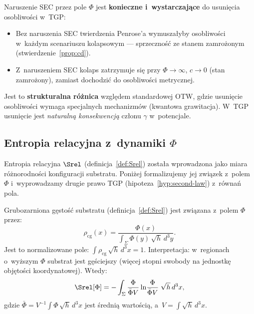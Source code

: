 \begin{remark}\label{rem:energ-sing}
Naruszenie SEC przez pole $\Phi$ jest \textbf{konieczne
i~wystarczaj\k{a}ce} do usuni\k{e}cia osobliwo\'sci w~TGP:
\begin{itemize}[nosep]
  \item Bez naruszenia SEC twierdzenia Penrose'a wymusza\l{}yby
    osobliwo\'sci w~ka\.zdym scenariuszu kolapsowym ---
    sprzeczno\'s\'c ze stanem zamro\.zonym
    (stwierdzenie~\ref{prop:cd}).
  \item Z~naruszeniem SEC kolaps zatrzymuje si\k{e} przy
    $\Phi \to \infty$, $c \to 0$ (stan zamro\.zony),
    zamiast dochodzi\'c do osobliwo\'sci metrycznej.
\end{itemize}
Jest to \textbf{strukturalna r\'o\.znica} wzgl\k{e}dem
standardowej OTW, gdzie usuni\k{e}cie osobliwo\'sci
wymaga specjalnych mechanizm\'ow (kwantowa grawitacja).
W~TGP usuni\k{e}cie jest \emph{naturaln\k{a} konsekwencj\k{a}}
cz\l{}onu $\gamma$ w~potencjale.
\end{remark}

\subsection{Entropia relacyjna z~dynamiki $\Phi$}\label{ssec:Srel-formal}

Entropia relacyjna $\Srel$ (definicja~\ref{def:Srel}) zosta\l{}a
wprowadzona jako miara r\'o\.znorodno\'sci konfiguracji substratu.
Poni\.zej formalizujemy jej zwi\k{a}zek z~polem $\Phi$
i~wyprowadzamy drugie prawo TGP (hipoteza~\ref{hyp:second-law})
z~r\'owna\'n pola.

\begin{proposition}\label{prop:Srel-Phi}
Grubozarniona g\k{e}sto\'s\'c substratu (definicja~\ref{def:Srel})
jest zwi\k{a}zana z~polem $\Phi$ przez:
\begin{equation}\label{eq:rho-cg-from-Phi}
    \rho_{\mathrm{cg}}(x)
    = \frac{\Phi(x)}{\int_\Sigma \Phi(y)\,\sqrt{h}\,d^3y}.
\end{equation}
Jest to normalizowane pole: $\int \rho_{\mathrm{cg}}\,\sqrt{h}\,d^3x = 1$.
Interpretacja: w~regionach o~wy\.zszym $\Phi$ substrat jest
g\k{e}\'sciejszy (wi\k{e}cej stopni swobody na jednostk\k{e}
obj\k{e}to\'sci koordynatowej). Wtedy:
\begin{equation}\label{eq:Srel-from-Phi}
    \Srel[\Phi] = -\int_\Sigma \frac{\Phi}{\bar{\Phi}V}
    \ln\!\frac{\Phi}{\bar{\Phi}V}\;\sqrt{h}\,d^3x,
\end{equation}
gdzie $\bar{\Phi} = V^{-1}\int\Phi\,\sqrt{h}\,d^3x$ jest
\'sredni\k{a} warto\'sci\k{a}, a~$V = \int\sqrt{h}\,d^3x$.
\end{proposition}

